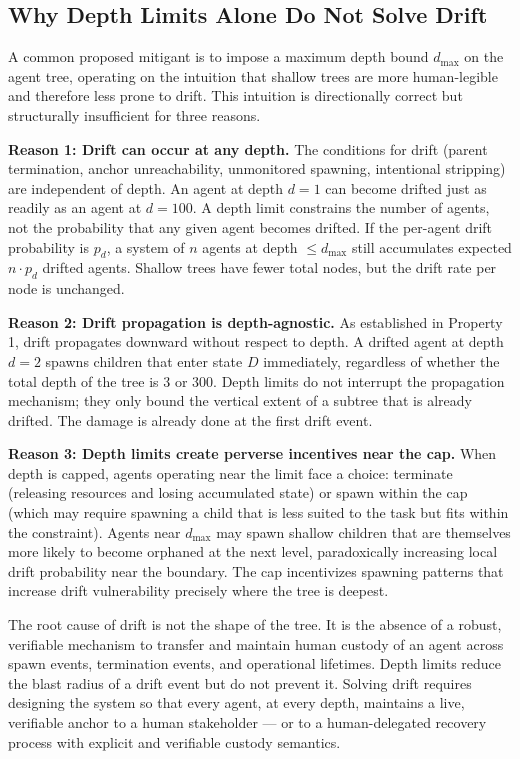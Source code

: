 \subsection{Why Depth Limits Alone Do Not Solve Drift}

A common proposed mitigant is to impose a maximum depth bound $d_{\max}$ on the agent tree, operating on the intuition that shallow trees are more human-legible and therefore less prone to drift. This intuition is directionally correct but structurally insufficient for three reasons.

\medskip
\noindent \textbf{Reason 1: Drift can occur at any depth.}
The conditions for drift (parent termination, anchor unreachability, unmonitored spawning, intentional stripping) are independent of depth. An agent at depth $d=1$ can become drifted just as readily as an agent at $d=100$. A depth limit constrains the number of agents, not the probability that any given agent becomes drifted. If the per-agent drift probability is $p_d$, a system of $n$ agents at depth $\leq d_{\max}$ still accumulates expected $n \cdot p_d$ drifted agents. Shallow trees have fewer total nodes, but the drift rate per node is unchanged.

\medskip
\noindent \textbf{Reason 2: Drift propagation is depth-agnostic.}
As established in Property 1, drift propagates downward without respect to depth. A drifted agent at depth $d=2$ spawns children that enter state $D$ immediately, regardless of whether the total depth of the tree is 3 or 300. Depth limits do not interrupt the propagation mechanism; they only bound the vertical extent of a subtree that is already drifted. The damage is already done at the first drift event.

\medskip
\noindent \textbf{Reason 3: Depth limits create perverse incentives near the cap.}
When depth is capped, agents operating near the limit face a choice: terminate (releasing resources and losing accumulated state) or spawn within the cap (which may require spawning a child that is less suited to the task but fits within the constraint). Agents near $d_{\max}$ may spawn shallow children that are themselves more likely to become orphaned at the next level, paradoxically increasing local drift probability near the boundary. The cap incentivizes spawning patterns that increase drift vulnerability precisely where the tree is deepest.

\medskip
The root cause of drift is not the shape of the tree. It is the absence of a robust, verifiable mechanism to transfer and maintain human custody of an agent across spawn events, termination events, and operational lifetimes. Depth limits reduce the blast radius of a drift event but do not prevent it. Solving drift requires designing the system so that every agent, at every depth, maintains a live, verifiable anchor to a human stakeholder --- or to a human-delegated recovery process with explicit and verifiable custody semantics.